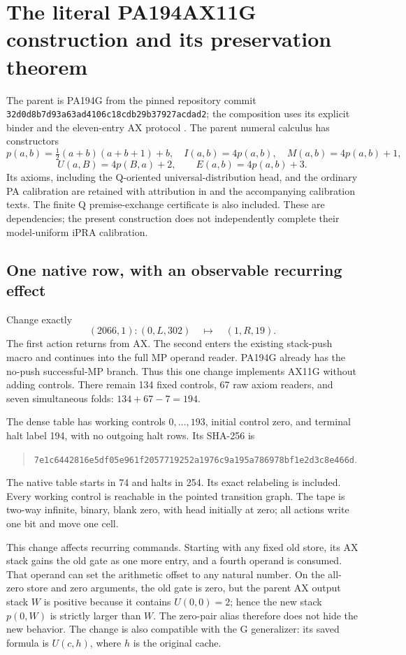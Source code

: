\section{The literal PA194AX11G construction and its preservation theorem}

The parent is PA194G from the pinned repository commit
\nolinkurl{32d0d8b7d93a63ad4106c18cdb29b37927acdad2}; the composition
uses its explicit binder and the eleven-entry AX protocol
\cite{generalizer,ax11-parent}.
The parent numeral calculus has constructors
\[
p(a,b)=\tfrac12(a+b)(a+b+1)+b,\quad I(a,b)=4p(a,b),\quad
M(a,b)=4p(a,b)+1,
\]
\[
U(a,B)=4p(B,a)+2,\qquad E(a,b)=4p(a,b)+3.
\]
Its axioms, including the Q-oriented universal-distribution head, and the
ordinary PA calibration are retained with attribution in
 and the accompanying
calibration texts. The finite Q premise-exchange certificate is also included.
These are dependencies; the present construction does not independently
complete their model-uniform iPRA calibration.

\subsection{One native row, with an observable recurring effect}

Change exactly
\[
 (2066,1):(0,L,302)\quad\longmapsto\quad(1,R,19).
\]
The first action returns from AX. The second enters the existing stack-push
macro and continues into the full MP operand reader. PA194G already has the
no-push successful-MP branch. Thus this one change implements AX11G without
adding controls. There remain 134 fixed controls, 67 raw axiom readers, and
seven simultaneous folds: $134+67-7=194$.

The dense table has working controls $0,\ldots,193$, initial control zero,
and terminal halt label 194, with no outgoing halt rows. Its SHA-256 is
\begin{quote}\small
\nolinkurl{7e1c6442816e5df05e961f2057719252a1976c9a195a786978bf1e2d3c8e466d}.
\end{quote}
The native table starts in 74 and halts in 254. Its exact relabeling is
included. Every working control is reachable in the pointed transition graph.
The tape is two-way infinite, binary, blank zero, with head initially at zero;
all actions write one bit and move one cell.

This change affects recurring commands. Starting with any fixed old store,
its AX stack gains the old gate as one more entry, and a fourth operand is
consumed. That operand can set the arithmetic offset to any natural number.
On the all-zero store and zero arguments, the old gate is zero, but the
parent AX output stack $W$ is positive because it contains $U(0,0)=2$; hence the new stack
$p(0,W)$ is strictly larger than $W$. The zero-pair alias therefore does not
hide the new behavior. The change is also compatible with the G generalizer:
its saved formula is $U(c,h)$, where $h$ is the original cache.

